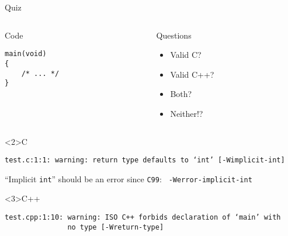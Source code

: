 \documentclass[presentation,aspectratio=169]{beamer}
\begin{document}
\begin{frame}[fragile,label={sec:orgb26de58}]{Quiz}
\begin{columns}
\begin{column}{0.48\columnwidth}
\begin{block}{Code}
\begin{verbatim}
main(void)
{
    /* ... */
}
\end{verbatim}
\end{block}
\end{column}

\begin{column}{0.48\columnwidth}
\begin{block}{Questions}
\begin{itemize}
\item Valid C?
\item Valid C++?
\item Both?
\item Neither!?
\end{itemize}
\end{block}
\end{column}
\end{columns}

\begin{block}<2>{C}
\begin{verbatim}
test.c:1:1: warning: return type defaults to ‘int’ [-Wimplicit-int]
\end{verbatim}
``Implicit \texttt{int}'' should be an error since \texttt{C99}: \texttt{ -Werror-implicit-int}
\end{block}

\vspace{-2cm}

\begin{block}<3>{C++}
\begin{verbatim}
test.cpp:1:10: warning: ISO C++ forbids declaration of ‘main’ with
               no type [-Wreturn-type]
\end{verbatim}
\end{block}
\end{frame}

\end{document}

